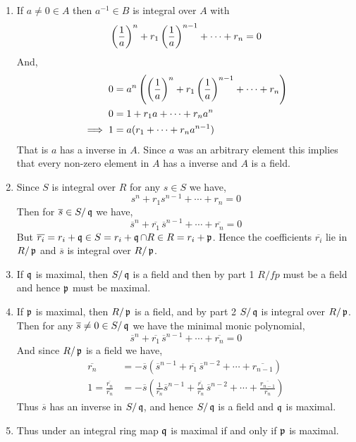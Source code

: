 \documentclass[Notebook.tex]{subfiles}
\begin{document}
\begin{solution}
    \bbni
    \begin{enumerate}
        \item If $a \neq 0 \in A$ then $a^{-1} \in B$ is integral over $A$ with 
        \[\left(\frac{1}{a}\right)^n + r_1\left(\frac{1}{a}\right)^{n-1} + \cdots + r_n = 0\]
        And, 
        \begin{align*}
           0 &= a^n \left(\left(\frac{1}{a}\right)^n + r_1\left(\frac{1}{a}\right)^{n-1} + \cdots + r_n\right) \\
           0 &= 1 + r_1a + \cdots + r_na^n  \\
           \implies 1 &= a(r_1 + \cdots + r_na^{n-1})
        \end{align*}
        That is $a$ has a inverse in $A$. Since $a$ was an arbitrary element this implies that every non-zero element in $A$ has a inverse and $A$ is a field. 

        \item Since $S$ is integral over $R$ for any $s\in S$ we have, 
        \[s^n + r_1s^{n-1} + \cdots + r_n = 0\]
        Then for $\overline{s} \in S/\operatorname{\mathfrak{q}}$ we have, 
        \[\overline{s}^n + \overline{r_1}\,\overline{s}^{n-1} + \cdots + \overline{r_n} = 0\]
        But $\overline{r_i} = r_i + \operatorname{\mathfrak{q}}  \in S = r_i + \operatorname{\mathfrak{q}} \cap R \in R = r_i + \operatorname{\mathfrak{p}}$. 
        Hence the coefficients $\overline{r_i}$ lie in $R/\operatorname{\mathfrak{p}}$ and $\overline{s}$ is integral over $R/\operatorname{\mathfrak{p}}$. 

        \item If $\operatorname{\mathfrak{q}}$ is maximal, then $S/\operatorname{\mathfrak{q}}$ is a field and then by part 1 $R/fp$ must be a field and hence $\operatorname{\mathfrak{p}}$ must be maximal. 
        
        \item If $\operatorname{\mathfrak{p}}$ is maximal, then $R/\operatorname{\mathfrak{p}}$ is a field, and by part 2 $S/\operatorname{\mathfrak{q}}$ is integral over $R/\operatorname{\mathfrak{p}}$. Then for any $\overline{s} \neq 0 \in S/\operatorname{\mathfrak{q}}$ we have the minimal monic polynomial, 
        \[\overline{s}^n + \overline{r_1}\,\overline{s}^{n-1} + \cdots + \overline{r_n} = 0\]
        And since $R/\operatorname{\mathfrak{p}}$ is a field we have,
        \begin{align*}
           \overline{r_n} &= - \overline{s}(\overline{s}^{n-1} + \overline{r_1}\,\overline{s}^{n-2} + \cdots + \overline{r_{n-1}} ) \\ 
           1 = \frac{\overline{r_n}}{\overline{r_n}} &= - \overline{s} \left (\frac{1}{\overline{r_n}}\overline{s}^{n-1} + \frac{\overline{r_1}}{{\overline{r_n}}}\,\overline{s}^{n-2} + \cdots + \frac{\overline{r_{n-1}}}{\overline{r_n}} \right)
        \end{align*}
        Thus $\overline{s}$ has an inverse in $S/\operatorname{\mathfrak{q}}$, and hence $S/\operatorname{\mathfrak{q}}$ is a field and $\operatorname{\mathfrak{q}}$ is maximal. 

        \item Thus under an integral ring map $\operatorname{\mathfrak{q}}$ is maximal if and only if $\operatorname{\mathfrak{p}}$ is maximal. 
    \end{enumerate}
\end{solution}
\end{document}
